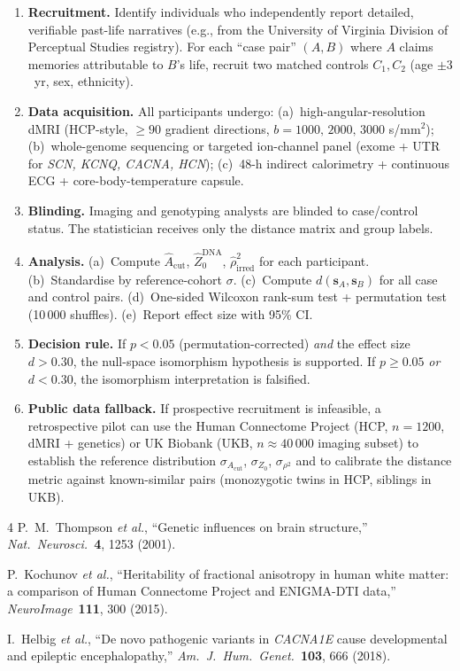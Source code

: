 \documentclass[aps,pre,twocolumn,superscriptaddress,floatfix]{revtex4-2}
\newcommand{\Acut}{A_{\text{cut}}}
\begin{document}
\begin{enumerate}
  \item \textbf{Recruitment.}\;
    Identify individuals who independently report
    detailed, verifiable past-life narratives (e.g.,
    from the University of Virginia Division of
    Perceptual Studies registry).
    For each ``case pair'' $(A,B)$ where $A$ claims
    memories attributable to $B$'s life, recruit two
    matched controls $C_1,C_2$ (age $\pm 3$~yr,
    sex, ethnicity).
  \item \textbf{Data acquisition.}\;
    All participants undergo:
    (a)~high-angular-resolution dMRI
    (HCP-style, $\ge 90$ gradient directions,
    $b=1000,\,2000,\,3000$ s/mm$^2$);
    (b)~whole-genome sequencing or targeted ion-channel
    panel (exome + UTR for \textit{SCN, KCNQ, CACNA,
    HCN});
    (c)~48-h indirect calorimetry + continuous ECG +
    core-body-temperature capsule.
  \item \textbf{Blinding.}\;
    Imaging and genotyping analysts are blinded to
    case/control status.  The statistician receives only
    the distance matrix and group labels.
  \item \textbf{Analysis.}\;
    (a)~Compute $\hat{A}_{\text{cut}}$,
    $\hat{Z}_0^{\text{DNA}}$,
    $\hat{\rho}_{\text{irred}}^2$ for each participant.
    (b)~Standardise by reference-cohort $\sigma$.
    (c)~Compute $d(\bm{s}_A,\bm{s}_B)$ for all case and
    control pairs.
    (d)~One-sided Wilcoxon rank-sum test +
    permutation test (10\,000 shuffles).
    (e)~Report effect size with 95\% CI.
  \item \textbf{Decision rule.}\;
    If $p < 0.05$ (permutation-corrected) \emph{and}
    the effect size $d > 0.30$, the null-space
    isomorphism hypothesis is supported.
    If $p \ge 0.05$ \emph{or} $d < 0.30$, the
    isomorphism interpretation is falsified.
  \item \textbf{Public data fallback.}\;
    If prospective recruitment is infeasible, a
    retrospective pilot can use the Human Connectome
    Project (HCP, $n=1200$, dMRI + genetics) or
    UK Biobank (UKB, $n\approx 40\,000$ imaging subset)
    to establish the reference distribution
    $\sigma_{\Acut}$, $\sigma_{Z_0}$,
    $\sigma_{\rho^2}$ and to calibrate the distance
    metric against known-similar pairs (monozygotic
    twins in HCP, siblings in UKB).
\end{enumerate}

\begin{thebibliography}{4}
P.~M.~Thompson \textit{et al.},
``Genetic influences on brain structure,''
\textit{Nat.\ Neurosci.}\ \textbf{4}, 1253 (2001).

P.~Kochunov \textit{et al.},
``Heritability of fractional anisotropy in human white
matter: a comparison of Human Connectome Project and
ENIGMA-DTI data,''
\textit{NeuroImage}\ \textbf{111}, 300 (2015).

I.~Helbig \textit{et al.},
``De novo pathogenic variants in \textit{CACNA1E} cause
developmental and epileptic encephalopathy,''
\textit{Am.\ J.\ Hum.\ Genet.}\ \textbf{103}, 666 (2018).
\end{thebibliography}
\end{document}
